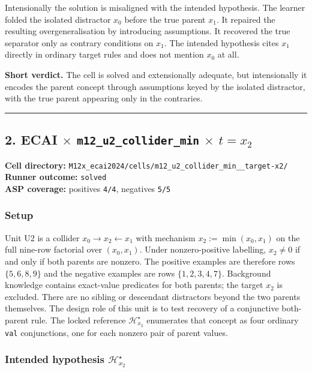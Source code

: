 \documentclass[11pt]{article}
\begin{document}
Intensionally the solution is misaligned with the intended hypothesis. The learner folded the isolated distractor \(x_0\) before the true parent \(x_1\). It repaired the resulting overgeneralisation by introducing assumptions. It recovered the true separator only as contrary conditions on \(x_1\). The intended hypothesis cites \(x_1\) directly in ordinary target rules and does not mention \(x_0\) at all.

\textbf{Short verdict.} The cell is solved and extensionally adequate, but intensionally it encodes the parent concept through assumptions keyed by the isolated distractor, with the true parent appearing only in the contraries.

\medskip\hrule\medskip

\subsection{\texorpdfstring{2. ECAI \(\times\) \texttt{m12\_u2\_collider\_min} \(\times\) \(t=x_2\)}{2. ECAI - m12-u2-collider-min - target x2}}

\textbf{Cell directory:} \texttt{M12x\_ecai2024/cells/m12\_u2\_collider\_min\_\_target-x2/}\\
\textbf{Runner outcome:} \texttt{solved}\\
\textbf{ASP coverage:} positives \texttt{4/4}, negatives \texttt{5/5}

\subsubsection{Setup}

Unit U2 is a collider \(x_0\to x_2\leftarrow x_1\) with mechanism \(x_2:=\min(x_0,x_1)\) on the full nine-row factorial over \((x_0,x_1)\). Under nonzero-positive labelling, \(x_2\neq 0\) if and only if both parents are nonzero. The positive examples are therefore rows \(\{5,6,8,9\}\) and the negative examples are rows \(\{1,2,3,4,7\}\). Background knowledge contains exact-value predicates for both parents; the target \(x_2\) is excluded. There are no sibling or descendant distractors beyond the two parents themselves. The design role of this unit is to test recovery of a conjunctive both-parent rule. The locked reference \(\mathcal{H}_{x_2}^\star\) enumerates that concept as four ordinary \texttt{val} conjunctions, one for each nonzero pair of parent values.

\subsubsection{\texorpdfstring{Intended hypothesis \(\mathcal{H}_{x_2}^\star\)}{Intended hypothesis H-star(x2)}}
\end{document}
